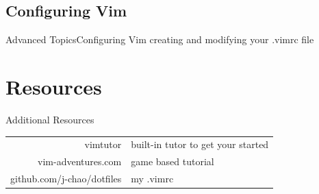 \documentclass{beamer}
\begin{document}
\subsection{Configuring Vim}
\begin{frame}[c]{Advanced Topics}{Configuring Vim}
    \centering
    creating and modifying your .vimrc file
\end{frame}


\section{Resources}
\begin{frame} {Additional Resources}
    \begin{table}[htpb]
        \centering
        \begin{tabular}{r|l}
            vimtutor & built-in tutor to get your started \\
            vim-adventures.com & game based tutorial \\
            github.com/j-chao/dotfiles & my .vimrc \\
        \end{tabular}
    \end{table}
\end{frame}
\end{document}
